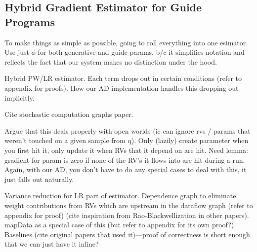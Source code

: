 \subsection{Hybrid Gradient Estimator for Guide Programs}

To make things as simple as possible, going to roll everything into one esimator. Use just $\phi$ for both generative and guide params, b/c it simplifies notation and reflects the fact that our system makes no distinction under the hood.

Hybrid PW/LR estimator. Each term drops out in certain conditions (refer to appendix for proofs). How our AD implementation handles this dropping out implicitly.

Cite stochastic computation graphs paper.

Argue that this deals properly with open worlds (ie can ignore rvs / params that weren’t touched on a given sample from q). Only (lazily) create parameter when you first hit it, only update it when RVs that it depend on are hit. Need lemma: gradient for param is zero if none of the RV’s it flows into are hit during a run. Again, with our AD, you don’t have to do any special cases to deal with this, it just falls out naturally.

Variance reduction for LR part of estimator. Dependence graph to eliminate weight contributions from RVs which are upstream in the dataflow graph (refer to appendix for proof) (cite inspiration from Rao-Blackwellization in other papers). mapData as a special case of this (but refer to appendix for its own proof?) Baselines (cite original papers that used it)---proof of correctness is short enough that we can just have it inline?

